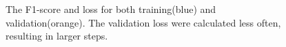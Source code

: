     \begin{figure}[H]
        \centering
        \qquad
        \caption[Loss and F1 score during training]{The F1-score and loss for both training(blue) and validation(orange). The validation loss were calculated less often, resulting in larger steps.}%
        \label{fig:example}%
    \end{figure}
    
